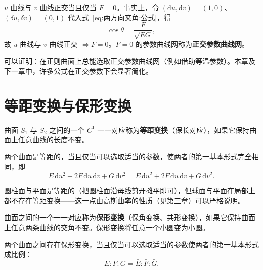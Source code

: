 \begin{proposition}[正交参数曲线网]
	$u$ 曲线与 $v$ 曲线正交当且仅当 $F=0$。事实上，令 $(\mathrm{d}u,\mathrm{d}v)=(1,0)$、$(\delta u,\delta v)=(0,1)$ 代入式~\eqref{eq:两方向夹角:公式}，得
	\begin{equation}
		\cos\theta=\frac{F}{\sqrt{EG}},
		\label{eq:正交曲线网:条件}
	\end{equation}
	故 $u$ 曲线与 $v$ 曲线正交 $\iff F=0$。$F=0$ 的参数曲线网称为\textbf{正交参数曲线网}。
\end{proposition}

\begin{remark}
	可以证明：在正则曲面上总能选取正交参数曲线网（例如借助等温参数）。本章及下一章中，许多公式在正交参数下会显著简化。
\end{remark}

\section{等距变换与保形变换}

\begin{definition}[等距变换]
	曲面 $S_1$ 与 $S_2$ 之间的一个 $C^1$ 一一对应称为\textbf{等距变换}（保长对应），如果它保持曲面上任意曲线的长度不变。
\end{definition}

\begin{theorem}[等距变换的判别]
	两个曲面是等距的，当且仅当可以选取适当的参数，使两者的第一基本形式完全相同，即
	\begin{equation}
		E\,\mathrm{d}u^{2}+2F\,\mathrm{d}u\,\mathrm{d}v+G\,\mathrm{d}v^{2}
		=\bar E\,\mathrm{d}\bar u^{2}+2\bar F\,\mathrm{d}\bar u\,\mathrm{d}\bar v+\bar G\,\mathrm{d}\bar v^{2}.
		\label{eq:等距变换:判别}
	\end{equation}
\end{theorem}

\begin{example}
	圆柱面与平面是等距的（把圆柱面沿母线剪开摊平即可），但球面与平面在局部上都不存在等距变换——这一点由高斯曲率的性质（见第三章）可以严格说明。
\end{example}

\begin{definition}[保形变换]
	曲面之间的一个一一对应称为\textbf{保形变换}（保角变换、共形变换），如果它保持曲面上任意两条曲线的交角不变。保形变换将任意一个小圆变为小圆。
\end{definition}

\begin{theorem}[保形变换的判别]
	两个曲面之间存在保形变换，当且仅当可以选取适当的参数使两者的第一基本形式成比例：
	\begin{equation}
		E:F:G=\bar E:\bar F:\bar G.
		\label{eq:保形变换:判别}
	\end{equation}
\end{theorem}

